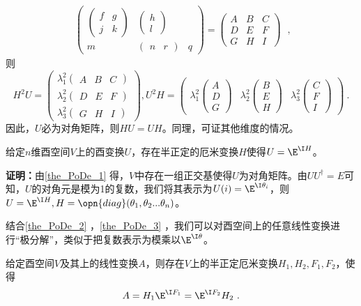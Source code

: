 \begin{equation}
\begin{aligned}
\begin{pmatrix}
\begin{pmatrix}
 f& g\\
  j& k 
\end{pmatrix}  & \begin{pmatrix}
 h\\
l
\end{pmatrix}\\
 m & \begin{pmatrix}
  n&r
\end{pmatrix} &q
\end{pmatrix}=\begin{pmatrix}
  A&  B&C \\
 D & E &F \\
 G &  H& I
\end{pmatrix}
\end{aligned}~,
\end{equation}
则\begin{equation}
H^2U=\begin{pmatrix}
 \lambda^2_1\begin{pmatrix}
 A &B  &C
\end{pmatrix}\\
 \lambda^2_2\begin{pmatrix}
 D &E  &F\end{pmatrix}\\
\lambda^2_3\begin{pmatrix}
 G &H  &I
\end{pmatrix}
\end{pmatrix},
U^2H=\begin{pmatrix}
 \lambda_1^2\begin{pmatrix}
 A\\
 D\\
G
\end{pmatrix} &\lambda_2^2 \begin{pmatrix}
 B\\
 E\\
H
\end{pmatrix} &\lambda_3^2\begin{pmatrix}
 C\\
 F\\
I
\end{pmatrix}
\end{pmatrix}~.
\end{equation}
因此，$U$必为对角矩阵，则$HU=UH$。同理，可证其他维度的情况。
\begin{theorem}{}\label{the_PoDe_3}
给定$n$维酉空间$V$上的酉变换$U$，存在半正定的厄米变换$H$使得$U=\E^{\I H}$。
\end{theorem}
\textbf{证明：}由\autoref{the_PoDe_1} 得，$V$中存在一组正交基使得$U$为对角矩阵。由$UU^{\dagger}=E$可知，$U$的对角元是模为1的复数，我们将其表示为$U(i)=\E^{\I\theta_i}$，则$U=\E^{\I H},H=\opn{diag}(\theta_1,\theta_2...\theta_n)$。

结合\autoref{the_PoDe_2} ，\autoref{the_PoDe_3} ，我们可以对酉空间上的任意线性变换进行“极分解”，类似于把复数表示为模乘以$\E^{\I\theta}$。
\begin{corollary}{}
给定酉空间$V$及其上的线性变换$A$，则存在$V$上的半正定厄米变换$H_1,H_2,F_1,F_2$，使得
\begin{equation}
A=H_1\E^{\I F_1}=\E^{\I F_2}H_2~.
\end{equation}
\end{corollary}
